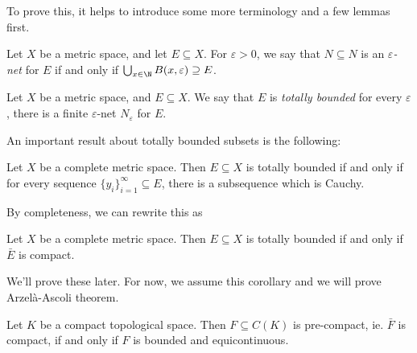 \documentclass[a4paper]{article}
\begin{document}
To prove this, it helps to introduce some more terminology and a few lemmas first.

\begin{defi}
  Let $X$ be a metric space, and let $E\subseteq X$. For $\varepsilon > 0$, we say that $N \subseteq N$ is an \emph{$\varepsilon$-net} for $E$ if and only if $\bigcup_{x \in \N}B(x, \varepsilon) \supseteq E$.
\end{defi}

\begin{defi}
  Let $X$ be a metric space, and $E\subseteq X$. We say that $E$ is \emph{totally bounded} for every $\varepsilon$, there is a finite $\varepsilon$-net $N_\varepsilon$ for $E$.
\end{defi}

An important result about totally bounded subsets is the following:
\begin{prop}
  Let $X$ be a complete metric space. Then $E\subseteq X$ is totally bounded if and only if for every sequence $\{y_i\}_{i = 1}^\infty \subseteq E$, there is a subsequence which is Cauchy.
\end{prop}

By completeness, we can rewrite this as
\begin{cor}
  Let $X$ be a complete metric space. Then $E\subseteq X$ is totally bounded if and only if $\bar{E}$ is compact.
\end{cor}

We'll prove these later. For now, we assume this corollary and we will prove Arzel\`a-Ascoli theorem.
\begin{thm}
  Let $K$ be a compact topological space. Then $F\subseteq C(K)$ is pre-compact, ie. $\bar{F}$ is compact, if and only if $F$ is bounded and equicontinuous.
\end{thm}
\end{document}
